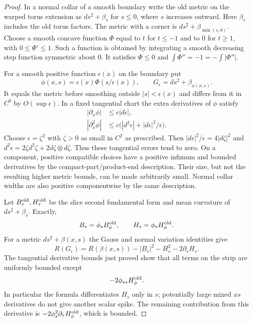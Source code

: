 \begin{proof}
In a normal collar of a smooth boundary write the old metric on the warped torus extension
as $ds^2+\beta_s$ for $s\le0$, where $s$ increases outward.  Here
$\beta_s$ includes the old torus factors.  The metric with a corner is
$ds^2+\beta_{\min(s,0)}$.  Choose a smooth concave function $\Phi$
equal to $t$ for $t\le-1$ and to $0$ for $t\ge1$, with
$0\le\Phi'\le1$.  Such a function is obtained by integrating a smooth
decreasing step function symmetric about $0$.  It satisfies
$\Phi\le0$ and $\int\Phi''=-1= -\int|\Phi''|$.

For a smooth positive function $\epsilon(x)$ on the boundary put
\[
 \phi(x,s)=\epsilon(x)\Phi(s/\epsilon(x)),\qquad
 G_\epsilon=ds^2+\beta_{\phi(x,s)}.
\]
It equals the metric before smoothing outside $|s|<\epsilon(x)$ and differs from it
in $C^0$ by $O(\sup\epsilon)$.  In a fixed tangential chart the extra
derivatives of $\phi$ satisfy
\begin{align*}
 |\partial_x\phi|&\le c|d\epsilon|,\\
 |\partial_x^2\phi|&\le
 c\bigl(|d^2\epsilon|+|d\epsilon|^2/\epsilon\bigr).
\end{align*}
Choose $\epsilon=\zeta^2$ with $\zeta>0$ as small in $C^2$ as
prescribed.  Then $|d\epsilon|^2/\epsilon=4|d\zeta|^2$ and
$d^2\epsilon=2\zeta d^2\zeta+2d\zeta\otimes d\zeta$.
Thus these tangential errors tend to zero.  On a component, positive
compatible choices have a positive infimum and bounded derivatives by
the compact-part/product-end description.  Their size, but not the
resulting higher metric bounds, can be made arbitrarily small.  Normal
collar widths are also positive componentwise by the same description.

Let $B^{\rm old}_\tau,H^{\rm old}_\tau$ be the slice second
fundamental form and mean curvature of $ds^2+\beta_s$.  Exactly,
\[
 B_s=\phi_sB^{\rm old}_{\phi},\qquad
 H_s=\phi_sH^{\rm old}_{\phi}.
\]
For a metric $ds^2+\beta(x,s)$ the Gauss and normal variation
identities give
\[
 R(G_\epsilon)=R(\beta(x,s))-|B_s|^2-H_s^2-2\partial_sH_s.
\]
The tangential derivative bounds just proved show that all terms on
the strip are uniformly bounded except
\begin{equation}\label{regular:spike}
 -2\phi_{ss}H^{\rm old}_{\phi}.
\end{equation}
In particular the formula differentiates $H_s$ only in $s$;
potentially large mixed $xs$ derivatives do not give another scalar
spike.  The remaining contribution from this derivative is
$-2\phi_s^2\partial_\tau H^{\rm old}_\phi$, which is bounded.


\end{proof}
